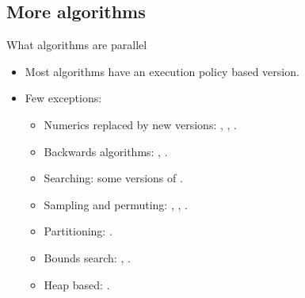\subsection{More algorithms}

\begin{frame}[t]{What algorithms are parallel}
\begin{itemize}
  \item Most algorithms have an execution policy based version.
  \item Few exceptions:
    \begin{itemize}
      \item Numerics replaced by new versions: 
            , ,
            .
      \item Backwards algorithms:
            , .
      \item Searching: some versions of .
      \item Sampling and permuting:
            , , .
      \item Partitioning: .
      \item Bounds search: , .
      \item Heap based: .
    \end{itemize}
\end{itemize}
\end{frame}
